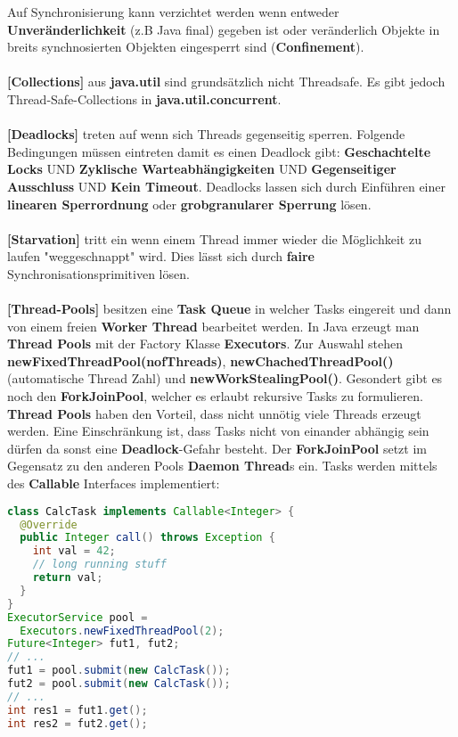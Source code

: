 \documentclass[8pt]{extarticle}
\let\oldtextbf\textbf
\renewcommand{\textbf}{\tiny\oldtextbf}
\begin{document}
\begin{multicols*}{5}
Auf Synchronisierung kann verzichtet werden wenn entweder \textbf{Unveränderlichkeit} (z.B Java final) gegeben ist oder veränderlich Objekte in breits synchnosierten Objekten eingesperrt sind (\textbf{Confinement}).\\\\
\textbf{[Collections]} aus \textbf{java.util} sind grundsätzlich nicht Threadsafe. Es gibt jedoch Thread-Safe-Collections in \textbf{java.util.concurrent}.\\\\
\textbf{[Deadlocks]} treten auf wenn sich Threads gegenseitig sperren. Folgende Bedingungen müssen eintreten damit es einen Deadlock gibt: \textbf{Geschachtelte Locks} UND \textbf{Zyklische Warteabhängigkeiten} UND \textbf{Gegenseitiger Ausschluss} UND \textbf{Kein Timeout}. Deadlocks lassen sich durch Einführen einer \textbf{linearen Sperrordnung} oder \textbf{grobgranularer Sperrung} lösen.\\\\
\textbf{[Starvation]} tritt ein wenn einem Thread immer wieder die Möglichkeit zu laufen "weggeschnappt" wird. Dies lässt sich durch \textbf{faire} Synchronisationsprimitiven lösen.\\\\
\textbf{[Thread-Pools]} besitzen eine \textbf{Task Queue} in welcher Tasks eingereit und dann von einem freien \textbf{Worker Thread} bearbeitet werden. In Java erzeugt man \textbf{Thread Pools} mit der Factory Klasse \textbf{Executors}. Zur Auswahl stehen \textbf{newFixedThreadPool(nofThreads)}, \textbf{newChachedThreadPool()} (automatische Thread Zahl) und \textbf{newWorkStealingPool()}. Gesondert gibt es noch den \textbf{ForkJoinPool}, welcher es erlaubt rekursive Tasks zu formulieren. \textbf{Thread Pools} haben den Vorteil, dass nicht unnötig viele Threads erzeugt werden. Eine Einschränkung ist, dass Tasks nicht von einander abhängig sein dürfen da sonst eine \textbf{Deadlock}-Gefahr besteht. Der \textbf{ForkJoinPool} setzt im Gegensatz zu den anderen Pools \textbf{Daemon Thread}s ein. Tasks werden mittels des \textbf{Callable} Interfaces implementiert:
\begin{lstlisting}[language=java]
class CalcTask implements Callable<Integer> {
  @Override
  public Integer call() throws Exception {
    int val = 42;
    // long running stuff
    return val;
  }
}
ExecutorService pool =
  Executors.newFixedThreadPool(2);
Future<Integer> fut1, fut2;
// ...
fut1 = pool.submit(new CalcTask());
fut2 = pool.submit(new CalcTask());
// ...
int res1 = fut1.get();
int res2 = fut2.get();

\end{lstlisting}
\end{multicols*}
\end{document}
